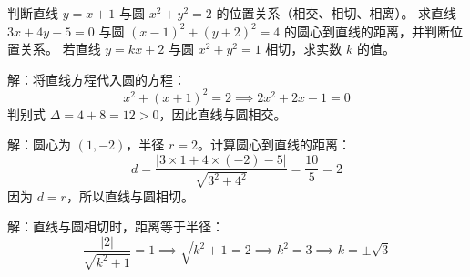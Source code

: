 \documentclass{ctexart}
\newenvironment{MyAnswer}[1][] %
 {\begin{tcolorbox}[breakable, colframe=blue] \begin{Answer}[#1] \color{blue} \kaishu}  %
 {\end{Answer}\end{tcolorbox}}
\begin{document}
\clearpage
\begin{Exercise}[title={直线与圆的位置关系小练习}, label={ex:line-circle}]
    \Question 判断直线 $ y = x + 1 $ 与圆 $ x^2 + y^2 = 2 $ 的位置关系（相交、相切、相离）。
    \Question 求直线 $ 3x + 4y - 5 = 0 $ 与圆 $ (x-1)^2 + (y+2)^2 = 4 $ 的圆心到直线的距离，并判断位置关系。
    \Question 若直线 $ y = kx + 2 $ 与圆 $ x^2 + y^2 = 1 $ 相切，求实数 $ k $ 的值。
\end{Exercise}
\begin{MyAnswer}[ref={ex:line-circle}]
        \Question 解：将直线方程代入圆的方程：
        $$
        x^2 + (x + 1)^2 = 2 \implies 2x^2 + 2x - 1 = 0
        $$
        判别式 $ \Delta = 4 + 8 = 12 > 0 $，因此直线与圆相交。

        \Question 解：圆心为 $ (1, -2) $，半径 $ r = 2 $。计算圆心到直线的距离：
        $$
        d = \frac{|3 \times 1 + 4 \times (-2) - 5|}{\sqrt{3^2 + 4^2}} = \frac{10}{5} = 2
        $$
        因为 $ d = r $，所以直线与圆相切。

        \Question 解：直线与圆相切时，距离等于半径：
        $$
        \frac{|2|}{\sqrt{k^2 + 1}} = 1 \implies \sqrt{k^2 + 1} = 2 \implies k^2 = 3 \implies k = \pm \sqrt{3}
        $$
\end{MyAnswer}
\end{document}
